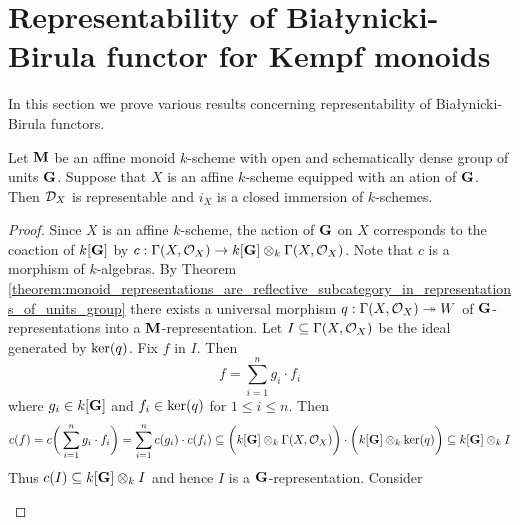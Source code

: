 \section{Representability of Bia{\l}ynicki-Birula functor for Kempf monoids}
\noindent
In this section we prove various results concerning representability of Bia{\l}ynicki-Birula functors.

\begin{theorem}\label{theorem:representability_of_bb_for_affine}
Let $\mathbf{M}$ be an affine monoid $k$-scheme with open and schematically dense group of units $\mathbf{G}$. Suppose that $X$ is an affine $k$-scheme equipped with an ation of $\mathbf{G}$. Then ${\mathcal D}_X$ is representable and $i_X$ is a closed immersion of $k$-schemes.
\end{theorem}
\begin{proof}
Since $X$ is an affine $k$-scheme, the action of $\mathbf{G}$ on $X$ corresponds to the coaction of $k[\mathbf{G}]$ by $c:\Gamma(X,{\mathcal O}_X)\rightarrow k[\mathbf{G}]\otimes_k\Gamma(X,{\mathcal O}_X)$. Note that $c$ is a morphism of $k$-algebras. By Theorem \ref{theorem:monoid_representations_are_reflective_subcategory_in_representations_of_units_group} there exists a universal morphism $q:\Gamma(X,{\mathcal O}_X)\twoheadrightarrow W$ of $\mathbf{G}$-representations into a $\mathbf{M}$-representation. Let $I\subseteq \Gamma(X,{\mathcal O}_X)$ be the ideal generated by $\mathrm{ker}(q)$. Fix $f$ in $I$. Then
$$f = \sum_{i=1}^ng_i\cdot f_i$$
where $g_i \in k[\mathbf{G}]$ and $f_i\in \mathrm{ker}(q)$ for $1\leq i\leq n$. Then
$$c(f) = c\bigg(\sum_{i=1}^n g_i\cdot f_i\bigg) = \sum_{i=1}^nc(g_i)\cdot c(f_i) \subseteq \bigg(k[\mathbf{G}]\otimes_k \Gamma(X,{\mathcal O}_X)\bigg) \cdot \bigg(k[\mathbf{G}]\otimes_k \mathrm{ker}(q) \bigg) \subseteq k[\mathbf{G}]\otimes_k I$$
Thus $c(I) \subseteq k[\mathbf{G}]\otimes_kI$ and hence $I$ is a $\mathbf{G}$-representation. Consider
\begin{center}
\end{center}

\end{proof}
